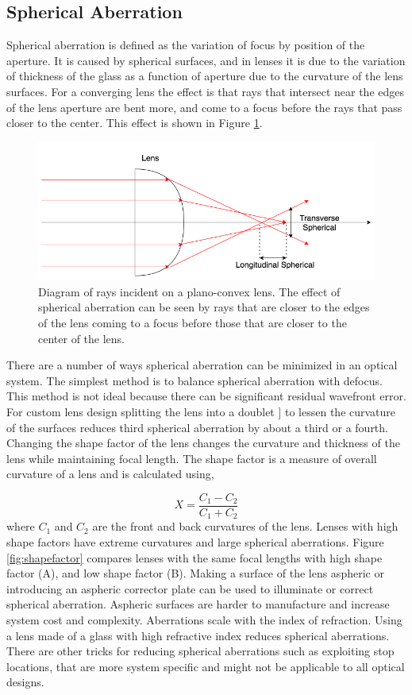 \subsection{Spherical Aberration}

Spherical aberration is defined as the variation of focus by position of the aperture. It is caused by spherical surfaces, and in lenses it is due to the variation of thickness of the glass as a function of aperture due to the curvature of the lens surfaces. For a converging lens the effect is that rays that intersect near the edges of the lens aperture are bent more, and come to a focus before the rays that pass closer to the center. This effect is shown in Figure \ref{fig:spherical}. 

\begin{figure}
    \centering
    \includegraphics[width=.8\textwidth]{Chapter Materials/Chapter Three Materials/spherical.png}
    \caption{Diagram of rays incident on a plano-convex lens. The effect of spherical aberration can be seen by rays that are closer to the edges of the lens coming to a focus before those that are closer to the center of the lens. }
    \label{fig:spherical}
\end{figure}

There are a number of ways spherical aberration can be minimized in an optical system. The simplest method is to balance spherical aberration with defocus. This method is not ideal because there can be significant residual wavefront error. For custom lens design splitting the lens into a doublet ] to lessen the curvature of the surfaces reduces third spherical aberration by about a third or a fourth. Changing the shape factor of the lens changes the curvature and thickness of the lens while maintaining focal length. The shape factor is a measure of overall curvature of a lens and is calculated using,

\begin{equation}
    X=\frac{C_1-C_2}{C_1+C_2}
\end{equation}
where $C_1$ and $C_2$ are the front and back curvatures of the lens. Lenses with high shape factors have extreme curvatures and large spherical aberrations. Figure \ref{fig:shapefactor} compares lenses with the same focal lengths with high shape factor (A), and low shape factor (B). Making a surface of the lens aspheric or introducing an aspheric corrector plate can be used to illuminate or correct spherical aberration. Aspheric surfaces are harder to manufacture and increase system cost and complexity. Aberrations scale with the index of refraction. Using a lens made of a glass with high refractive index reduces spherical aberrations. There are other tricks for reducing spherical aberrations such as exploiting stop locations, that are more system specific and might not be applicable to all optical designs. 

